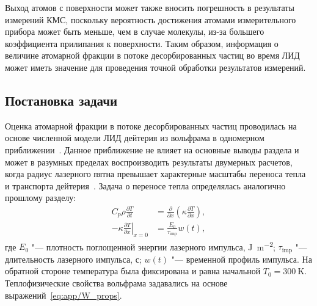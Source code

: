 Выход атомов с поверхности может также вносить погрешность в результаты измерений КМС, поскольку вероятность достижения атомами измерительного прибора может быть меньше, чем в случае молекулы, из-за большего коэффициента прилипания к поверхности. Таким образом, информация о величине атомарной фракции в потоке десорбированных частиц во время ЛИД может иметь значение для проведения точной обработки результатов измерений.

\subsection{Постановка задачи}\label{subsec:ch4/seс2/subsec1}
Оценка атомарной фракции в потоке десорбированных частиц проводилась на основе численной модели ЛИД дейтерия из вольфрама в одномерном приближении~\cite{Kulagin2023}. Данное приближение не влияет на основные выводы раздела и может в разумных пределах воспроизводить результаты двумерных расчетов, когда радиус лазерного пятна превышает характерные масштабы переноса тепла и транспорта дейтерия~\cite{Stepanenko2024}. Задача о переносе тепла определялась аналогично прошлому разделу:
\begin{subequations}
    \label{eq:ch4/LID_heat_equation}
    \begin{align}
        C_p \rho \frac{\partial T}{\partial t}                         & = \frac{\partial}{\partial x}\left( \kappa \frac{\partial T}{\partial x} \right), \\
        -\kappa \left. \frac{\partial T}{\partial x} \right\vert_{x=0} & = \frac{E_0}{\tau_\mathrm{imp}} w(t),
    \end{align}
\end{subequations}
где \( E_0 \) "--- плотность поглощенной энергии лазерного импульса, \si{\joule\per\meter\squared}; \( \tau_\mathrm{imp} \) "--- длительность лазерного импульса, с; \(w(t) \) "--- временной профиль импульса. На обратной стороне температура была фиксирована и равна начальной \(T_0=\SI{300}{\kelvin}\). Теплофизические свойства вольфрама задавались на основе выражений~\cref{eq:app/W_props}.

